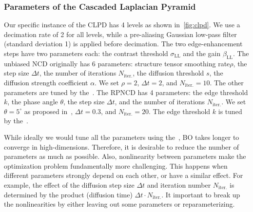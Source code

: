 \subsubsection{Parameters of the Cascaded Laplacian Pyramid}
Our specific instance of the CLPD has 4 levels as shown in~\cref{fig:clpd}.
We use a decimation rate of 2 for all levels, while a pre-aliasing Gaussian low-pass filter (standard deviation 1) is applied before decimation.
The two edge-enhancement steps have two parameters each: the contrast threshold \(\sigma_{\mathrm{LL}}\) and the gain \(\beta_{\mathrm{LL}}\).
The unbiased NCD originally has 6 parameters: structure tensor smoothing rate\(\rho\), the step size \(\Delta t\), the number of iterations \(N_{\text{iter.}}\), the diffusion threshold \(s\), the diffusion strength coefficient \(\alpha\).
We set \(\rho = 2\), \(\Delta t = 2\), and \(N_{\text{iter.}} = 10\).
The other parameters are tuned by the~\usdg.
The RPNCD has 4 parameters: the edge threshold \(k\), the phase angle \(\theta\), the step size \(\Delta t\), and the number of iterations \(N_{\text{iter.}}\).
We set \(\theta = 5^{\circ}\) as proposed in~\cite{gilboa_image_2004}, \(\Delta t = 0.3\), and \(N_{\text{iter.}} = 20\).
The edge threshold \(k\) is tuned by the~\usdg.

While ideally we would tune all the parameters using the~\usdg, BO takes longer to converge in high-dimensions.
Therefore, it is desirable to reduce the number of parameters as much as possible.
Also, nonlinearity between parameters make the optimization problem fundamentally more challenging.
This happens when different parameters strongly depend on each other, or have a similar effect.
For example, the effect of the diffusion step size \(\Delta t\) and iteration number \(N_{\text{iter.}}\) is determined by the product (diffusion time) \(\Delta t \cdot N_{\text{iter.}}\).
It important to break up the nonlinearities by either leaving out some parameters or reparameterizing.

